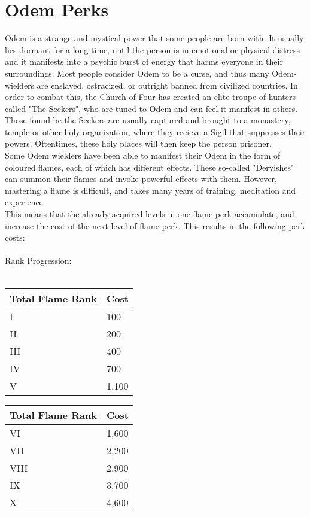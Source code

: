 \chapter{Odem Perks}\label{ch:odemPerks}
Odem is a strange and mystical power that some people are born with.
It usually lies dormant for a long time, until the person is in emotional or physical distress and it manifests into a psychic burst of energy that harms everyone in their surroundings.
Most people consider Odem to be a curse, and thus many Odem-wielders are enslaved, ostracized, or outright banned from civilized countries.
In order to combat this, the Church of Four has created an elite troupe of hunters called "The Seekers", who are tuned to Odem and can feel it manifest in others.
Those found be the Seekers are usually captured and brought to a monastery, temple or other holy organization, where they recieve a Sigil that suppresses their powers.
Oftentimes, these holy places will then keep the person prisoner.\\
Some Odem wielders have been able to manifest their Odem in the form of coloured flames, each of which has different effects.
These so-called "Dervishes" can summon their flames and invoke powerful effects with them.
However, mastering a flame is difficult, and takes many years of training, meditation and experience.\\
This means that the already acquired levels in one flame perk accumulate, and increase the cost of the next level of flame perk.
This results in the following perk costs:\\
\\
Rank Progression:\\
\\
\begin{minipage}{0.30\textwidth}
    \begin{tabular}{l | l}
        Total Flame Rank & Cost\\ \hline
        I & 100\\
        II & 200\\
        III & 400\\
        IV & 700\\
        V & 1,100\\
    \end{tabular}
\end{minipage}
\begin{minipage}{0.30\textwidth}
    \begin{tabular}{l | l}
        Total Flame Rank & Cost\\ \hline
        VI & 1,600\\
        VII & 2,200\\
        VIII & 2,900\\
        IX & 3,700\\
        X & 4,600\\
    \end{tabular}
\end{minipage}
